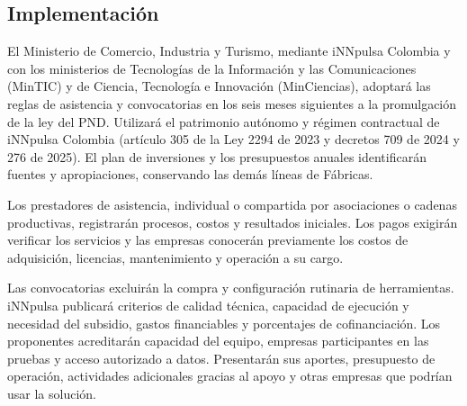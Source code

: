 
\subsection{Implementación}

El Ministerio de Comercio, Industria y Turismo, mediante iNNpulsa Colombia y con los ministerios de Tecnologías de la Información y las Comunicaciones (MinTIC) y de Ciencia, Tecnología e Innovación (MinCiencias), adoptará las reglas de asistencia y convocatorias en los seis meses siguientes a la promulgación de la ley del PND. Utilizará el patrimonio autónomo y régimen contractual de iNNpulsa Colombia (artículo 305 de la Ley 2294 de 2023 y decretos 709 de 2024 y 276 de 2025). El plan de inversiones y los presupuestos anuales identificarán fuentes y apropiaciones, conservando las demás líneas de Fábricas.

Los prestadores de asistencia, individual o compartida por asociaciones o cadenas productivas, registrarán procesos, costos y resultados iniciales. Los pagos exigirán verificar los servicios y las empresas conocerán previamente los costos de adquisición, licencias, mantenimiento y operación a su cargo.

Las convocatorias excluirán la compra y configuración rutinaria de herramientas. iNNpulsa publicará criterios de calidad técnica, capacidad de ejecución y necesidad del subsidio, gastos financiables y porcentajes de cofinanciación. Los proponentes acreditarán capacidad del equipo, empresas participantes en las pruebas y acceso autorizado a datos. Presentarán sus aportes, presupuesto de operación, actividades adicionales gracias al apoyo y otras empresas que podrían usar la solución.

